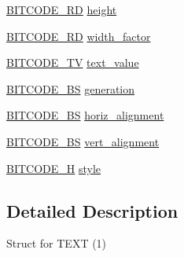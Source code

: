 \begin{DoxyCompactItemize}
\hyperlink{dwg_8h_a309e7e59a4030a89943640d0d327cef7}{\-B\-I\-T\-C\-O\-D\-E\-\_\-\-R\-D} \hyperlink{struct__dwg__entity__TEXT_ac163188e33388f677b893365e6a0a077}{height}
\item 
\hyperlink{dwg_8h_a309e7e59a4030a89943640d0d327cef7}{\-B\-I\-T\-C\-O\-D\-E\-\_\-\-R\-D} \hyperlink{struct__dwg__entity__TEXT_a47dbce0c9c2e5f5516b1335c3cb74b79}{width\-\_\-factor}
\item 
\hyperlink{dwg_8h_a2a7e040c6e36ca039b03608679ecaf7c}{\-B\-I\-T\-C\-O\-D\-E\-\_\-\-T\-V} \hyperlink{struct__dwg__entity__TEXT_a101342ad7db7c791e99c796080441a28}{text\-\_\-value}
\item 
\hyperlink{dwg_8h_a94297606fbd4a4ff97e8add284af0809}{\-B\-I\-T\-C\-O\-D\-E\-\_\-\-B\-S} \hyperlink{struct__dwg__entity__TEXT_a29ccc49cbe255ab140ace20bb7757781}{generation}
\item 
\hyperlink{dwg_8h_a94297606fbd4a4ff97e8add284af0809}{\-B\-I\-T\-C\-O\-D\-E\-\_\-\-B\-S} \hyperlink{struct__dwg__entity__TEXT_a9cdf8c80bd4fe63085e1b554cbc28fee}{horiz\-\_\-alignment}
\item 
\hyperlink{dwg_8h_a94297606fbd4a4ff97e8add284af0809}{\-B\-I\-T\-C\-O\-D\-E\-\_\-\-B\-S} \hyperlink{struct__dwg__entity__TEXT_a8c5864350ebfec619231b2b0bcd95980}{vert\-\_\-alignment}
\item 
\hyperlink{dwg_8h_a7c700e94e047a97ba8c24bdfe4029dc3}{\-B\-I\-T\-C\-O\-D\-E\-\_\-\-H} \hyperlink{struct__dwg__entity__TEXT_a1f6b0d7935720ce1ae2a454e7866c6d6}{style}
\end{DoxyCompactItemize}


\subsection{\-Detailed \-Description}
\-Struct for \-T\-E\-X\-T (1) 

